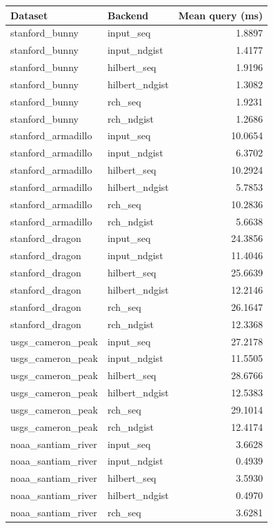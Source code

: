 \begin{tabular}{llr}
Dataset & Backend & Mean query (ms) \\
\hline
stanford\_bunny & input\_seq & 1.8897 \\
stanford\_bunny & input\_ndgist & 1.4177 \\
stanford\_bunny & hilbert\_seq & 1.9196 \\
stanford\_bunny & hilbert\_ndgist & 1.3082 \\
stanford\_bunny & rch\_seq & 1.9231 \\
stanford\_bunny & rch\_ndgist & 1.2686 \\
stanford\_armadillo & input\_seq & 10.0654 \\
stanford\_armadillo & input\_ndgist & 6.3702 \\
stanford\_armadillo & hilbert\_seq & 10.2924 \\
stanford\_armadillo & hilbert\_ndgist & 5.7853 \\
stanford\_armadillo & rch\_seq & 10.2836 \\
stanford\_armadillo & rch\_ndgist & 5.6638 \\
stanford\_dragon & input\_seq & 24.3856 \\
stanford\_dragon & input\_ndgist & 11.4046 \\
stanford\_dragon & hilbert\_seq & 25.6639 \\
stanford\_dragon & hilbert\_ndgist & 12.2146 \\
stanford\_dragon & rch\_seq & 26.1647 \\
stanford\_dragon & rch\_ndgist & 12.3368 \\
usgs\_cameron\_peak & input\_seq & 27.2178 \\
usgs\_cameron\_peak & input\_ndgist & 11.5505 \\
usgs\_cameron\_peak & hilbert\_seq & 28.6766 \\
usgs\_cameron\_peak & hilbert\_ndgist & 12.5383 \\
usgs\_cameron\_peak & rch\_seq & 29.1014 \\
usgs\_cameron\_peak & rch\_ndgist & 12.4174 \\
noaa\_santiam\_river & input\_seq & 3.6628 \\
noaa\_santiam\_river & input\_ndgist & 0.4939 \\
noaa\_santiam\_river & hilbert\_seq & 3.5930 \\
noaa\_santiam\_river & hilbert\_ndgist & 0.4970 \\
noaa\_santiam\_river & rch\_seq & 3.6281 \\

\end{tabular}
